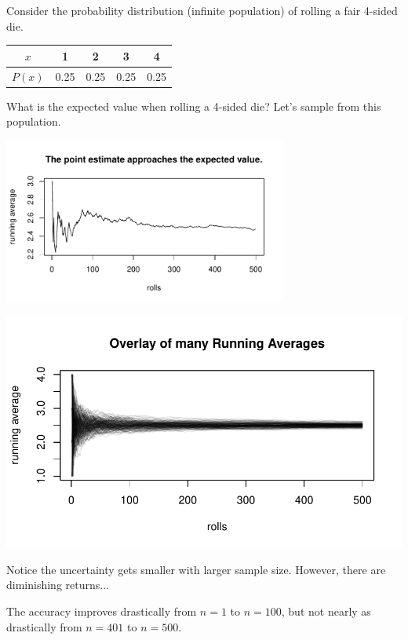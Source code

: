 \begin{frame}
Consider the probability distribution (infinite population) of rolling a fair 4-sided die.
\begin{center}
\begin{tabular}{|c | c c c c|} \hline
$x$    & 1    &  2   & 3    & 4\\\hline
$P(x)$ & 0.25 & 0.25 & 0.25 & 0.25 \\ \hline
\end{tabular}
\end{center}
What is the expected value when rolling a 4-sided die? \pause
{}
\vfill
Let's sample from this population.
\pause
\vspace{-15pt}
\begin{center}
\includegraphics[width=0.7\textwidth]{4-1_var_in_est/figures/running_mean_4sided_die/running_die.pdf}
\end{center}
\vfill
\end{frame}


\begin{frame}
\vspace{-10pt}
\begin{center}
\includegraphics[width=\textwidth]{4-1_var_in_est/figures/running_mean_4sided_die/running_die_overlay.pdf}
\end{center}
\vspace{-20pt}
Notice the uncertainty gets smaller with larger sample size. However, there are diminishing returns...

The accuracy improves drastically from $n=1$ to $n=100$, but not nearly as drastically from $n=401$ to $n=500$.
\end{frame}



